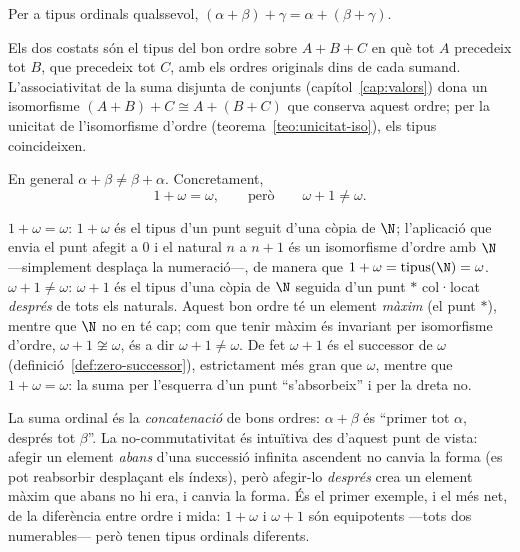 \begin{proposicio}\label{prop:suma-associativa}
Per a tipus ordinals qualssevol, \((\alpha+\beta)+\gamma=\alpha+(\beta+\gamma)\).
\end{proposicio}

\begin{prova}
Els dos costats són el tipus del bon ordre sobre \(A+B+C\) en què tot \(A\)
precedeix tot \(B\), que precedeix tot \(C\), amb els ordres originals dins de
cada sumand. L'associativitat de la suma disjunta de conjunts
(capítol~\ref{cap:valors}) dona un isomorfisme \((A+B)+C\cong A+(B+C)\) que
conserva aquest ordre; per la unicitat de l'isomorfisme d'ordre
(teorema~\ref{teo:unicitat-iso}), els tipus coincideixen.
\end{prova}

\begin{proposicio}\label{prop:suma-no-commutativa}
En general \(\alpha+\beta\neq\beta+\alpha\). Concretament,
\[
1+\omega=\omega,
\qquad\text{però}\qquad
\omega+1\neq\omega .
\]
\end{proposicio}

\begin{prova}
\emph{\(1+\omega=\omega\)}: \(1+\omega\) és el tipus d'un punt seguit d'una
còpia de \(\N\); l'aplicació que envia el punt afegit a \(0\) i el natural
\(n\) a \(n+1\) és un isomorfisme d'ordre amb \(\N\) ---simplement desplaça la
numeració---, de manera que \(1+\omega=\operatorname{tipus}(\N)=\omega\).
\emph{\(\omega+1\neq\omega\)}: \(\omega+1\) és el tipus d'una còpia de \(\N\)
seguida d'un punt \(\ast\) col·locat \emph{després} de tots els naturals.
Aquest bon ordre té un element \emph{màxim} (el punt \(\ast\)), mentre que
\(\N\) no en té cap; com que tenir màxim és invariant per isomorfisme d'ordre,
\(\omega+1\not\cong\omega\), és a dir \(\omega+1\neq\omega\). De fet
\(\omega+1\) és el successor de \(\omega\) (definició~\ref{def:zero-successor}),
estrictament més gran que \(\omega\), mentre que \(1+\omega=\omega\): la suma
per l'esquerra d'un punt \enquote{s'absorbeix} i per la dreta no.
\end{prova}

\begin{observacio}\label{obs:suma-classica}
La suma ordinal és la \emph{concatenació} de bons ordres: \(\alpha+\beta\) és
\enquote{primer tot \(\alpha\), després tot \(\beta\)}. La no-commutativitat
és intuïtiva des d'aquest punt de vista: afegir un element \emph{abans} d'una
successió infinita ascendent no canvia la forma (es pot reabsorbir desplaçant
els índexs), però afegir-lo \emph{després} crea un element màxim que abans no
hi era, i canvia la forma. És el primer exemple, i el més net, de la
diferència entre ordre i mida: \(1+\omega\) i \(\omega+1\) són equipotents
---tots dos numerables--- però tenen tipus ordinals diferents.
\end{observacio}


